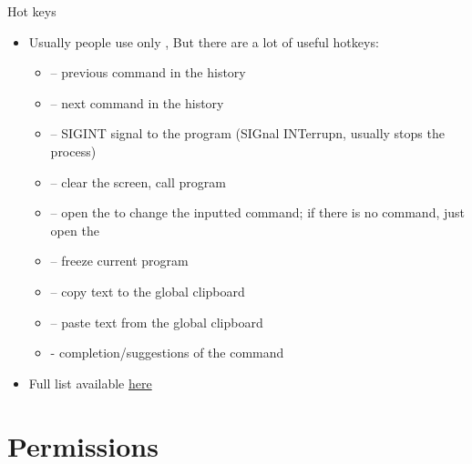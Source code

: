 \documentclass[usenames,dvipsnames,10pt,aspectratio=169]{beamer}
\begin{document}
\begin{frame}{Hot keys}
    \begin{itemize}
        \item Usually people use only , But there are a lot of useful hotkeys:
            \begin{itemize}
                \item {} -- previous command in the history
                \item {} -- next command in the history 
                \item {} -- SIGINT signal to the program (SIGnal INTerrupn, usually stops the process)
                \item {} -- clear the screen, call  program
                \item {} -- open the  to change the inputted command; if there is no command, just open the 
                \item {} -- freeze current program
                \item {} -- copy text to the global clipboard
                \item {} -- paste text from the global clipboard
                \item {} - completion/suggestions of the command
            \end{itemize}
        \item Full list available \href{https://telegra.ph/BashGoryachie-klavishi-09-17}{here}
    \end{itemize}
\end{frame}


\section{Permissions}

\end{document}
